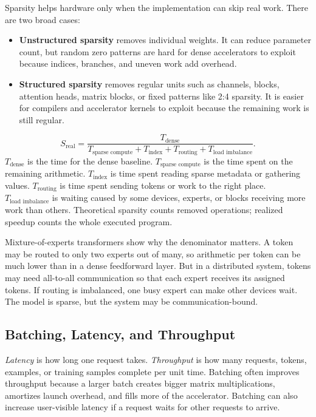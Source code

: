 Sparsity helps hardware only when the implementation can skip real work. There are two broad cases:

\begin{itemize}[leftmargin=*]
  \item \textbf{Unstructured sparsity} removes individual weights. It can reduce parameter count, but random zero patterns are hard for dense accelerators to exploit because indices, branches, and uneven work add overhead.
  \item \textbf{Structured sparsity} removes regular units such as channels, blocks, attention heads, matrix blocks, or fixed patterns like 2:4 sparsity. It is easier for compilers and accelerator kernels to exploit because the remaining work is still regular.
\end{itemize}

\begin{keyequation}
\[
  S_{\text{real}} =
  \frac{T_{\text{dense}}}
       {T_{\text{sparse compute}} + T_{\text{index}} + T_{\text{routing}} + T_{\text{load imbalance}}}.
\]
\tcblower
\(T_{\text{dense}}\) is the time for the dense baseline. \(T_{\text{sparse compute}}\) is the time spent on the remaining arithmetic. \(T_{\text{index}}\) is time spent reading sparse metadata or gathering values. \(T_{\text{routing}}\) is time spent sending tokens or work to the right place. \(T_{\text{load imbalance}}\) is waiting caused by some devices, experts, or blocks receiving more work than others. Theoretical sparsity counts removed operations; realized speedup counts the whole executed program.
\end{keyequation}

Mixture-of-experts transformers show why the denominator matters. A token may be routed to only two experts out of many, so arithmetic per token can be much lower than in a dense feedforward layer. But in a distributed system, tokens may need all-to-all communication so that each expert receives its assigned tokens. If routing is imbalanced, one busy expert can make other devices wait. The model is sparse, but the system may be communication-bound.

\subsection{Batching, Latency, and Throughput}

\emph{Latency} is how long one request takes. \emph{Throughput} is how many requests, tokens, examples, or training samples complete per unit time. Batching often improves throughput because a larger batch creates bigger matrix multiplications, amortizes launch overhead, and fills more of the accelerator. Batching can also increase user-visible latency if a request waits for other requests to arrive.

